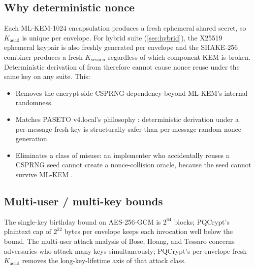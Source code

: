 \subsection{Why deterministic nonce}

Each ML-KEM-1024 encapsulation produces a fresh ephemeral shared secret, so $K_{\mathrm{aead}}$ is unique per envelope. For hybrid suite  (\cref{sec:hybrid}), the X25519 ephemeral keypair is also freshly generated per envelope and the SHAKE-256 combiner produces a fresh $K_{\mathrm{session}}$ regardless of which component KEM is broken. Deterministic derivation of  from  therefore cannot cause nonce reuse under the same key on any suite. This:
\begin{itemize}
\item Removes the encrypt-side CSPRNG dependency beyond ML-KEM's internal  randomness.
\item Matches PASETO v4.local's philosophy \citep{paseto-v4}: deterministic derivation under a per-message fresh key is structurally safer than per-message random nonce generation.
\item Eliminates a class of misuse: an implementer who accidentally reuses a CSPRNG seed cannot create a nonce-collision oracle, because the seed cannot survive ML-KEM  \citep{fips203}.
\end{itemize}

\subsection{Multi-user / multi-key bounds}

The single-key birthday bound on AES-256-GCM is $2^{64}$ blocks; PQCrypt's plaintext cap of $2^{32}$ bytes per envelope keeps each invocation well below the bound. The multi-user attack analysis of Bose, Hoang, and Tessaro \citep{bose2018muser,hoang2024gcmsst} concerns adversaries who attack many keys simultaneously; PQCrypt's per-envelope fresh $K_{\mathrm{aead}}$ removes the long-key-lifetime axis of that attack class.
